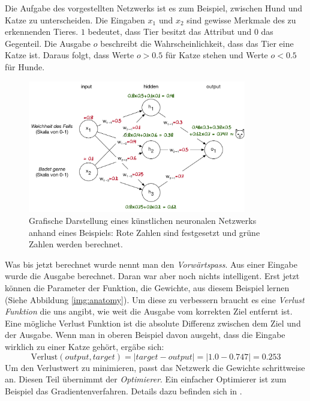Die Aufgabe des vorgestellten Netzwerks ist es zum Beispiel, zwischen Hund und Katze zu unterscheiden. Die Eingaben $x_1$ und $x_2$ sind gewisse Merkmale des zu erkennenden Tieres. $1$ bedeutet, dass Tier besitzt das Attribut und $0$ das Gegenteil. Die Ausgabe $o$ beschreibt die Wahrscheinlichkeit, dass das Tier eine Katze ist. Daraus folgt, dass Werte $o>0.5$ für Katze stehen und Werte $o<0.5$ für Hunde.
\begin{figure}[hbt]
	\centering
		\includegraphics[width=0.85\textwidth]{assets/neural_net.png}
	\caption{Grafische Darstellung eines künstlichen neuronalen Netzwerks anhand eines Beispiels: Rote Zahlen sind festgesetzt und grüne Zahlen werden berechnet.}
	\label{img:neuralnet}
\end{figure}

Was bis jetzt berechnet wurde nennt man den \textit{Vorwärtspass}. Aus einer Eingabe wurde die Ausgabe berechnet. Daran war aber noch nichts intelligent. Erst jetzt können die Parameter der Funktion, die Gewichte, aus diesem Beispiel lernen (Siehe Abbildung \ref{img:anatomy}). Um diese zu verbessern braucht es eine \textit{Verlust Funktion} die uns angibt, wie weit die Ausgabe vom korrekten Ziel entfernt ist. Eine mögliche Verlust Funktion ist die absolute Differenz zwischen dem Ziel und der Ausgabe. Wenn man in oberen Beispiel davon ausgeht, dass die Eingabe wirklich zu einer Katze gehört, ergäbe sich:
$$ \text{Verlust}(output, target) = |target-output| = |1.0-0.747| = 0.253$$
Um den Verlustwert zu minimieren, passt das Netzwerk die Gewichte schrittweise an. Diesen Teil übernimmt der  \textit{Optimierer}. Ein einfacher Optimierer ist zum Beispiel das Gradientenverfahren. Details dazu befinden sich in \parencite{gradient}.

